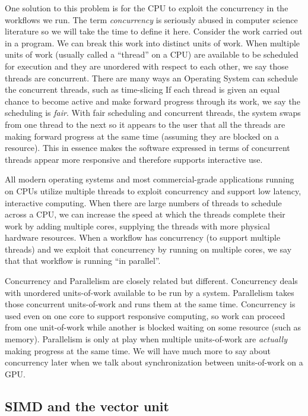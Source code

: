 One solution to this problem is for the CPU to exploit the concurrency in the workflows we run.
The term \emph{concurrency} is seriously abused in computer science literature so we will
take the time to define it here.   Consider the work carried out in a program.   We can break this work into 
distinct units of work.  When multiple units of work (usually called a ``thread'' on a CPU) are 
available to be scheduled for execution and they are unordered with respect to each other, we say those threads are concurrent.  
There are many ways an Operating System can schedule the concurrent threads, such as time-slicing  If each thread is given an equal chance
to become active and make forward progress through its work, we say the scheduling is \emph{fair}.  With fair scheduling
and concurrent threads, the system swaps from one thread to the next so it appears to the user that all the threads
are making forward progress at the same time (assuming they are blocked on a resource).   This in essence makes the
software expressed in terms of concurrent threads appear more responsive and therefore supports interactive use.

All modern operating systems and most commercial-grade applications running on CPUs utilize multiple threads to
exploit concurrency and support low latency, interactive computing.  When there are large numbers
of threads to schedule across a CPU, we can increase the speed at which the threads complete their work by adding multiple 
cores, supplying the threads with more physical hardware resources.  When a workflow has concurrency (to support multiple threads) and we exploit that concurrency by running on 
multiple cores, we say that that workflow is running ``in parallel''.

Concurrency and Parallelism are closely related but 
different.  Concurrency deals with unordered units-of-work available to be run by a system.  Parallelism takes those 
concurrent units-of-work and runs them at the same time.  Concurrency is used even on one core to support 
responsive computing, so work can proceed from one unit-of-work while another is blocked waiting on some resource (such as 
memory).  Parallelism is only at play when multiple units-of-work are \emph{actually} making progress at the same time.  We will have 
much more to say about concurrency later when we talk about synchronization between units-of-work on a GPU.

\subsection{SIMD and the vector unit}

